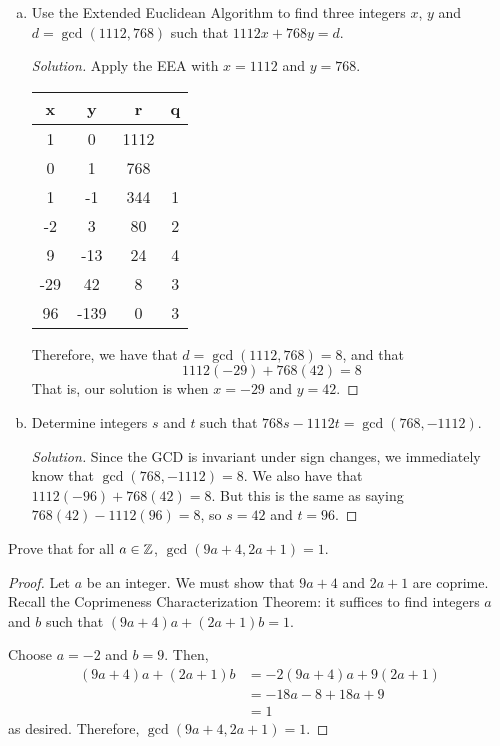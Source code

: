 \question \begin{enumerate}[(a)]
  \item Use the Extended Euclidean Algorithm to find three integers $x$, $y$ and
        $d = \gcd(1112, 768)$ such that $1112x + 768y = d$.
        \begin{proof}[Solution]
          Apply the EEA with $x=1112$ and $y=768$.
          \begin{center}
            \begin{tabular}{C|C|C|C}
              x   & y    & r    & q \\    & 0    & 1112     \\
              0   & 1    & 768      \\
              1   & -1   & 344  & 1 \\
              -2  & 3    & 80   & 2 \\
              9   & -13  & 24   & 4 \\
              -29 & 42   & 8    & 3 \\   & -139 & 0    & 3
            \end{tabular}
          \end{center}
          Therefore, we have that $d=\gcd(1112,768)=8$, and that
          \[ 1112(-29) + 768(42) = 8 \]
          That is, our solution is when $x=-29$ and $y=42$.
        \end{proof}
  \item Determine integers $s$ and $t$ such that $768s - 1112t = \gcd(768, -1112)$.
        \begin{proof}[Solution]
          Since the GCD is invariant under sign changes, we immediately know that $\gcd(768,-1112)=8$.
          We also have that $1112(-96) + 768(42) = 8$.
          But this is the same as saying $768(42) - 1112(96) = 8$, so $s=42$ and $t=96$.
        \end{proof}
\end{enumerate}


\question Prove that for all $a\in\mathbb{Z}$, $\gcd(9a + 4, 2a + 1) = 1$.
\begin{proof}
  Let $a$ be an integer.
  We must show that $9a+4$ and $2a+1$ are coprime.
  Recall the Coprimeness Characterization Theorem:
  it suffices to find integers $a$ and $b$ such that $(9a+4)a + (2a+1)b = 1$.

  Choose $a=-2$ and $b=9$. Then,
  \begin{align*}
    (9a+4)a + (2a+1)b & = -2(9a+4)a + 9(2a+1) \\
                      & = -18a-8 + 18a+9      \\
                      & = 1
  \end{align*}
  as desired. Therefore, $\gcd(9a+4,2a+1) = 1$.
\end{proof}



